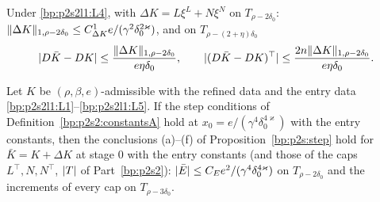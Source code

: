 \begin{lemma}\label{bp:p2s2l1:frame}
Under \ref{bp:p2s2l1:L4}, with $\Delta K=L\xi^L+N\xi^N$ on $T_{\rho-2\delta_0}$:
$\lVert \Delta K\rVert_{1,\rho-2\delta_0}\le C^1_{\Delta K}e/(\gamma^2\delta_0^{2\varkappa})$, and on $T_{\rho-(2+\eta)\delta_0}$
\[
\lvert D\bar K-DK\rvert\le\frac{\lVert \Delta K\rVert_{1,\rho-2\delta_0}}{e\eta\delta_0},\qquad\lvert (D\bar K-DK)^\top\rvert\le\frac{2n\lVert \Delta K\rVert_{1,\rho-2\delta_0}}{e\eta\delta_0}.
\]
\end{lemma}

\begin{proposition}\label{bp:p2s2l1:entryA}
Let $K$ be $(\rho,\beta,e)$-admissible with the refined data and the entry data \ref{bp:p2s2l1:L1}--\ref{bp:p2s2l1:L5}. If the step conditions of
Definition~\ref{bp:p2s2:constantsA} hold at $x_0=e/(\gamma^4\delta_0^{4\varkappa})$ with the entry constants, then the conclusions (a)--(f) of
Proposition~\ref{bp:p2s:step} hold for $\bar K=K+\Delta K$ at stage $0$ with the entry constants (and those of the caps $L^\top,N,N^\top$, $\lvert T\rvert$ of
Part~\ref{bp:p2s2}): $\lvert \bar E\rvert\le C_Ee^2/(\gamma^4\delta_0^{4\varkappa})$ on $T_{\rho-2\delta_0}$ and the increments of every cap on $T_{\rho-3\delta_0}$.
\end{proposition}

